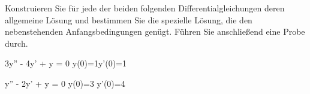 \begin{atiTask}[
	title = Die charakteristische Gleichung,
	topic = Gewöhnliche Differentialgleichungen,
	subtopic = Die lineare homogene Differentialgleichung 2. Ordnung mit konstanten Koeffizienten,
	language = Deutsch,
]
	Konstruieren Sie für jede der beiden folgenden Differentialgleichungen deren allgemeine Lösung und bestimmen Sie die spezielle Lösung, die den nebenstehenden Anfangsbedingungen genügt.
	Führen Sie anschließend eine Probe durch.
	\begin{atiSubequations}
		\item{
			3y'' - 4y' + y = 0 \separate y(0)=1\separate y'(0)=1
		}
		\item{
			\hphantom{3}y'' - 2y' + y = 0 \separate y(0)=3 \separate y'(0)=4
		}
	\end{atiSubequations}
\end{atiTask}